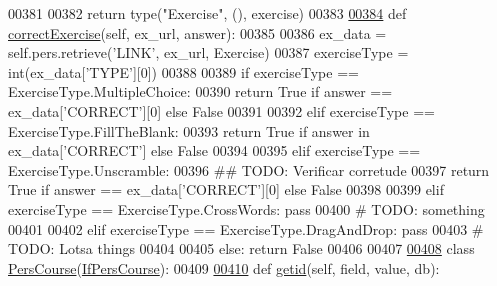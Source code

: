 \begin{DoxyCode}
00381 
00382         \textcolor{keywordflow}{return} type(\textcolor{stringliteral}{"Exercise"}, (), exercise)
00383 
\hypertarget{CourseUnit_8py_source_l00384}{}\hyperlink{classCourse_1_1CourseUnit_1_1BusCourse_a3414d888b6ce30bc9cfb3c2b2e78af65}{00384}     \textcolor{keyword}{def }\hyperlink{classCourse_1_1CourseUnit_1_1BusCourse_a3414d888b6ce30bc9cfb3c2b2e78af65}{correctExercise}(self, ex\_url, answer):
00385         
00386         ex\_data = self.pers.retrieve(\textcolor{stringliteral}{'LINK'}, ex\_url, Exercise)
00387         exerciseType = int(ex\_data[\textcolor{stringliteral}{'TYPE'}][0])
00388 
00389         \textcolor{keywordflow}{if} exerciseType == ExerciseType.MultipleChoice:
00390             \textcolor{keywordflow}{return} \textcolor{keyword}{True} \textcolor{keywordflow}{if} answer == ex\_data[\textcolor{stringliteral}{'CORRECT'}][0] \textcolor{keywordflow}{else} \textcolor{keyword}{False}
00391 
00392         \textcolor{keywordflow}{elif} exerciseType == ExerciseType.FillTheBlank:
00393             \textcolor{keywordflow}{return} \textcolor{keyword}{True} \textcolor{keywordflow}{if} answer \textcolor{keywordflow}{in} ex\_data[\textcolor{stringliteral}{'CORRECT'}] \textcolor{keywordflow}{else} \textcolor{keyword}{False}
00394 
00395         \textcolor{keywordflow}{elif} exerciseType == ExerciseType.Unscramble:
00396             \textcolor{comment}{## TODO: Verificar corretude}
00397             \textcolor{keywordflow}{return} \textcolor{keyword}{True} \textcolor{keywordflow}{if} answer == ex\_data[\textcolor{stringliteral}{'CORRECT'}][0] \textcolor{keywordflow}{else} \textcolor{keyword}{False}
00398 
00399         \textcolor{keywordflow}{elif} exerciseType == ExerciseType.CrossWords: \textcolor{keywordflow}{pass}
00400             \textcolor{comment}{# TODO: something}
00401 
00402         \textcolor{keywordflow}{elif} exerciseType == ExerciseType.DragAndDrop: \textcolor{keywordflow}{pass}
00403             \textcolor{comment}{# TODO: Lotsa things}
00404 
00405         \textcolor{keywordflow}{else}: \textcolor{keywordflow}{return} \textcolor{keyword}{False}
00406 
00407 
\hypertarget{CourseUnit_8py_source_l00408}{}\hyperlink{classCourse_1_1CourseUnit_1_1PersCourse}{00408} \textcolor{keyword}{class }\hyperlink{classCourse_1_1CourseUnit_1_1PersCourse}{PersCourse}(\hyperlink{classCourse_1_1CourseUnit_1_1IfPersCourse}{IfPersCourse}):
00409 
\hypertarget{CourseUnit_8py_source_l00410}{}\hyperlink{classCourse_1_1CourseUnit_1_1PersCourse_acfe23f8591380715d02d815193b30ca5}{00410}     \textcolor{keyword}{def }\hyperlink{classCourse_1_1CourseUnit_1_1PersCourse_acfe23f8591380715d02d815193b30ca5}{getid}(self, field, value, db):

\end{DoxyCode}
